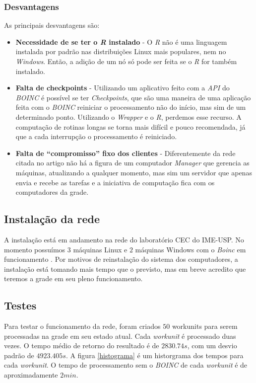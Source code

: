 \subsubsection{Desvantagens}

As principais desvantagens são:

\begin{itemize}
  \item \textbf{Necessidade de se ter o \emph{R} instalado} - O \emph{R} não é uma linguagem instalada por padrão
nas distribuições Linux mais populares, nem no \emph{Windows}. Então, a adição de um nó só pode ser feita se o \emph{R}
for também instalado. 
  \item \textbf{Falta de checkpoints} - Utilizando um aplicativo feito com a \emph{API} do \emph{BOINC} é possível se ter
\emph{Checkpoints}, que são uma maneira de uma aplicação feita com o \emph{BOINC} reiniciar o processamento
não do início, mas sim de um determinado ponto. Utilizando o \emph{Wrapper} e o \emph{R}, perdemos esse recurso. A computação
de rotinas longas se torna mais difícil e pouco recomendada, já que a cada interrupção o processamento é reiniciado. 
  \item \textbf{Falta de ``compromisso'' fixo dos clientes} - Diferentemente da rede citada no artigo \cite{Dias}
não há a figura de um computador \emph{Manager} que gerencia as máquinas, atualizando a qualquer momento, mas sim um servidor 
que apenas envia e recebe as tarefas e a iniciativa de computação fica com os computadores da grade. 

\end{itemize}

\subsection{Instalação da rede}

A instalação está em andamento na rede do laboratório CEC do IME-USP. No momento possuímos $3$ máquinas Linux e $2$ máquinas Windows com o \emph{Boinc}
em funcionamento . Por motivos de reinstalação do sistema dos computadores, a instalação está tomando 
mais tempo que o previsto, mas em breve acredito que teremos a grade em seu pleno funcionamento. 

\subsection{Testes}

Para testar o funcionamento da rede, foram criados $50$ workunits para serem processadas na grade em seu estado atual. 
Cada \emph{workunit} é processado duas vezes. O tempo médio de retorno do resultado é de $2830.74s$, com um desvio
padrão de $4923.405s$. A figura \ref{histograma}
é um historgrama dos tempos para cada \emph{workunit}. O tempo de processamento sem o \emph{BOINC} 
de cada \emph{workunit} é de aproximadamente $2 min$.

